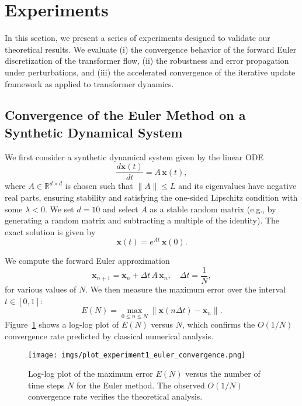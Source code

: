 
\section{Experiments}

In this section, we present a series of experiments designed to validate our theoretical results. We evaluate (i) the convergence behavior of the forward Euler discretization of the transformer flow, (ii) the robustness and error propagation under perturbations, and (iii) the accelerated convergence of the iterative update framework as applied to transformer dynamics.

\subsection{Convergence of the Euler Method on a Synthetic Dynamical System}
\label{sec:toy_dynamical_system}

We first consider a synthetic dynamical system given by the linear ODE
\[
\frac{d\mathbf{x}(t)}{dt} = A\, \mathbf{x}(t),
\]
where \(A \in \mathbb{R}^{d \times d}\) is chosen such that \(\|A\|\le L\) and its eigenvalues have negative real parts, ensuring stability and satisfying the one-sided Lipschitz condition with some \(\lambda < 0\). We set \(d=10\) and select \(A\) as a stable random matrix (e.g., by generating a random matrix and subtracting a multiple of the identity). The exact solution is given by
\[
\mathbf{x}(t) = e^{At}\,\mathbf{x}(0).
\]

We compute the forward Euler approximation
\[
\mathbf{x}_{n+1} = \mathbf{x}_n + \Delta t\, A\,\mathbf{x}_n,\quad \Delta t = \frac{1}{N},
\]
for various values of \(N\). We then measure the maximum error over the interval \(t\in[0,1]\):
\[
E(N) = \max_{0\le n\le N}\|\mathbf{x}(n\Delta t) - \mathbf{x}_n\|.
\]
Figure~\ref{fig:euler_convergence} shows a log-log plot of \(E(N)\) versus \(N\), which confirms the \(O(1/N)\) convergence rate predicted by classical numerical analysis.

\begin{figure}[ht]
  \centering
  \texttt{[image: imgs/plot\_experiment1\_euler\_convergence.png]}
  \caption{Log-log plot of the maximum error \(E(N)\) versus the number of time steps \(N\) for the Euler method. The observed \(O(1/N)\) convergence rate verifies the theoretical analysis.}
  \label{fig:euler_convergence}
\end{figure}

